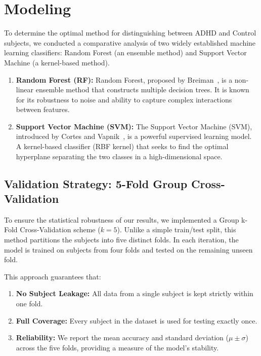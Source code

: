 \documentclass[11pt,a4paper]{article}
\begin{document}
\section{Modeling}\label{sec:modeling}
To determine the optimal method for distinguishing between ADHD and Control subjects, we conducted a comparative analysis of two widely 
established machine learning classifiers: Random Forest (an ensemble method) and Support Vector Machine (a kernel-based method).

\begin{enumerate}
    \item \textbf{Random Forest (RF):} Random Forest, proposed by Breiman~\cite{breiman2001random}, is a non-linear ensemble method that 
        constructs multiple decision trees. It is known for its robustness to noise and ability to capture complex interactions between 
        features.
    \item \textbf{Support Vector Machine (SVM):} The Support Vector Machine (SVM), introduced by Cortes and Vapnik~\cite{cortes1995support}, 
        is a powerful supervised learning model. A kernel-based classifier (RBF kernel) that seeks to find the optimal hyperplane separating 
        the two classes in a high-dimensional space.
\end{enumerate}

\subsection{Validation Strategy: 5-Fold Group Cross-Validation}
To ensure the statistical robustness of our results, we implemented a Group k-Fold Cross-Validation scheme ($k=5$). Unlike a simple 
train/test split, this method partitions the subjects into five distinct folds. In each iteration, the model is trained on subjects from four 
folds and tested on the remaining unseen fold.

This approach guarantees that:
\begin{enumerate}
    \item \textbf{No Subject Leakage:} All data from a single subject is kept strictly within one fold.
    \item \textbf{Full Coverage:} Every subject in the dataset is used for testing exactly once.
    \item \textbf{Reliability:} We report the mean accuracy and standard deviation ($\mu \pm \sigma$) across the five folds, providing a 
    measure of the model's stability.
\end{enumerate}
\end{document}
